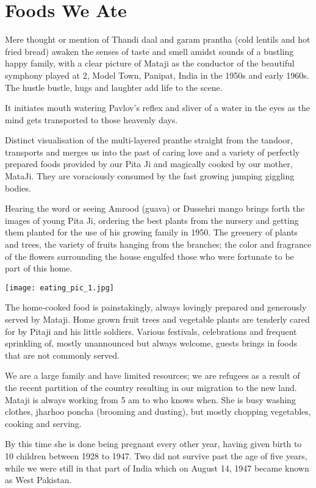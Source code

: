 \chapter{Foods We Ate}
Mere thought or mention of Thandi daal and garam prantha (cold lentils and
hot fried bread) awaken the senses of taste and smell amidst sounds of
a bustling happy family, with a clear picture of Mataji as the conductor
of the beautiful symphony played at 2, Model Town, Panipat, India in the
1950s and early 1960s. The hustle bustle, hugs and laughter add life to
the scene. 

It initiates mouth watering Pavlov's reflex and sliver of a water in the
eyes as the mind gets transported to those heavenly days.

Distinct visualisation of the multi-layered pranthe straight from the
tandoor, transports and merges us into the past of caring love and
a variety of perfectly prepared foods provided by our Pita Ji and
magically cooked by our mother, MataJi. They are voraciously consumed by
the fast growing jumping giggling bodies. 

Hearing the word or seeing Amrood (guava) or Dussehri mango brings forth
the images of young Pita Ji, ordering the best plants from the nursery and
getting them planted for the use of his growing family in 1950. The
greenery of plants and trees, the variety of fruits hanging from the
branches; the color and fragrance of the flowers surrounding the house
engulfed those who were fortunate to be part of this home. 

\texttt{[image: eating\_pic\_1.jpg]}

The home-cooked food is painstakingly, always lovingly prepared and
generously served by Mataji. Home grown fruit trees and vegetable plants
are tenderly cared for by Pitaji and his little soldiers. Various
festivals, celebrations and frequent sprinkling of, mostly unannounced but
always welcome, guests brings in foods that are not commonly served. 

We are a large family and have limited resources; we are refugees as
a result of the recent partition of the country resulting in our migration
to the new land. Mataji is always working from 5 am to who knows when. She
is busy washing clothes, jharhoo poncha (brooming and dusting), but mostly
chopping vegetables, cooking and serving. 

By this time she is done being pregnant every other year, having given
birth to 10 children between 1928 to 1947. Two did not survive past the
age of five years, while we were still in that part of India which on
August 14, 1947 became known as West Pakistan. 

